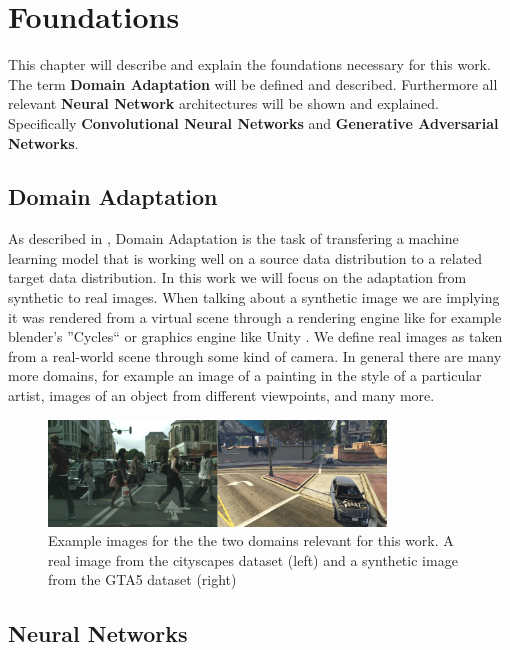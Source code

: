 \chapter{Foundations}
\label{sec:foundations}

This chapter will describe and explain the foundations necessary for this work. The term \textbf{Domain Adaptation} will be defined and described. Furthermore all relevant \textbf{Neural Network} architectures will be shown and explained. Specifically \textbf{Convolutional Neural Networks} and \textbf{Generative Adversarial Networks}.


\section{Domain Adaptation}
As described in \cite{DBLP:journals/corr/Csurka17},
Domain Adaptation is the task of transfering a machine learning model that is working well on a source data distribution to a related target data distribution. In this work we will focus on the adaptation from synthetic to real images. When talking about a synthetic image we are implying it was rendered from a virtual scene through a rendering engine like for example blender's ''Cycles`` \cite{Cycles} or graphics engine like Unity \cite{Unity}. We define real images as taken from a real-world scene through some kind of camera. In general there are many more domains, for example an image of a painting in the style of a particular artist, images of an object from different viewpoints, and many more.

\begin{figure}
	\centering
	 \includegraphics[width=0.8\textwidth]{../images/DA_examples_cityscapes_gta.png}
	\caption{Example images for the the two domains relevant for this work. A real image from the cityscapes dataset \cite{Cordts_2016_CVPR} (left) and a synthetic image from the GTA5 dataset \cite{Richter_2016_ECCV} (right)}
\end{figure}

\section{Neural Networks}

